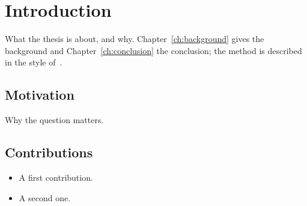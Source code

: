 \chapter{Introduction}\label{ch:introduction}

What the thesis is about, and why. Chapter~\ref{ch:background} gives the
background and Chapter~\ref{ch:conclusion} the conclusion; the method is
described in the style of~\cite{knuth84}.

\section{Motivation}
Why the question matters.

\section{Contributions}
\begin{itemize}
  \item A first contribution.
  \item A second one.
\end{itemize}
